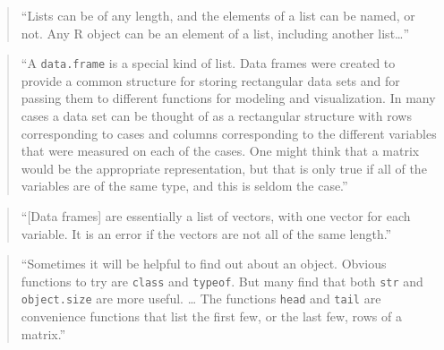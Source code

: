 \documentclass[]{tufte-book}
\begin{document}
\begin{quote}
``Lists can be of any length, and the elements of a list can be named, or not.
Any R object can be an element of a list, including another list\ldots{}'' \citep{gentleman2008r}
\end{quote}

\begin{quote}
``A \texttt{data.frame} is a special kind of list. Data frames were created to provide a
common structure for storing rectangular data sets and for passing them to
different functions for modeling and visualization. In many cases a data set can be
thought of as a rectangular structure with rows corresponding to cases and columns
corresponding to the different variables that were measured on each of the cases. One
might think that a matrix would be the appropriate representation, but that is only
true if all of the variables are of the same type, and this is seldom the case.''
\citep{gentleman2008r}
\end{quote}

\begin{quote}
``{[}Data frames{]} are essentially a list of vectors, with one vector for each variable.
It is an error if the vectors are not all of the same length.'' \citep{gentleman2008r}
\end{quote}

\begin{quote}
``Sometimes it will be helpful to find out about an object. Obvious functions to
try are \texttt{class} and \texttt{typeof}. But many find that both \texttt{str} and \texttt{object.size} are
more useful. \ldots{} The functions \texttt{head} and \texttt{tail} are convenience functions that list
the first few, or the last few, rows of a matrix.'' \citep{gentleman2008r}
\end{quote}
\end{document}
